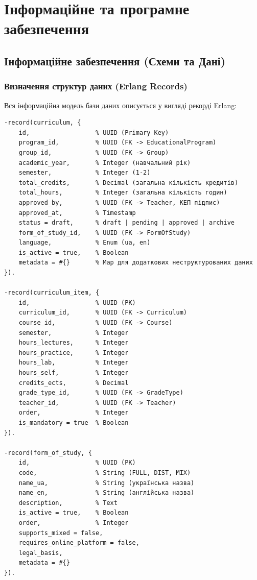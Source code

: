 \documentclass{article}
\begin{document}
\newpage
\section{Інформаційне та програмне забезпечення}

\subsection{Інформаційне забезпечення (Схеми та Дані)}

\subsubsection{Визначення структур даних (Erlang Records)}
Вся інформаційна модель бази даних описується у вигляді рекорді Erlang:
\begin{verbatim}
-record(curriculum, {
    id,                  % UUID (Primary Key)
    program_id,          % UUID (FK -> EducationalProgram)
    group_id,            % UUID (FK -> Group)
    academic_year,       % Integer (навчальний рік)
    semester,            % Integer (1-2)
    total_credits,       % Decimal (загальна кількість кредитів)
    total_hours,         % Integer (загальна кількість годин)
    approved_by,         % UUID (FK -> Teacher, КЕП підпис)
    approved_at,         % Timestamp
    status = draft,      % draft | pending | approved | archive
    form_of_study_id,    % UUID (FK -> FormOfStudy)
    language,            % Enum (ua, en)
    is_active = true,    % Boolean
    metadata = #{}       % Map для додаткових неструктурованих даних
}).

-record(curriculum_item, {
    id,                  % UUID (PK)
    curriculum_id,       % UUID (FK -> Curriculum)
    course_id,           % UUID (FK -> Course)
    semester,            % Integer
    hours_lectures,      % Integer
    hours_practice,      % Integer
    hours_lab,           % Integer
    hours_self,          % Integer
    credits_ects,        % Decimal
    grade_type_id,       % UUID (FK -> GradeType)
    teacher_id,          % UUID (FK -> Teacher)
    order,               % Integer
    is_mandatory = true  % Boolean
}).

-record(form_of_study, {
    id,                  % UUID (PK)
    code,                % String (FULL, DIST, MIX)
    name_ua,             % String (українська назва)
    name_en,             % String (англійська назва)
    description,         % Text
    is_active = true,    % Boolean
    order,               % Integer
    supports_mixed = false,
    requires_online_platform = false,
    legal_basis,
    metadata = #{}
}).


\end{verbatim}
\end{document}
